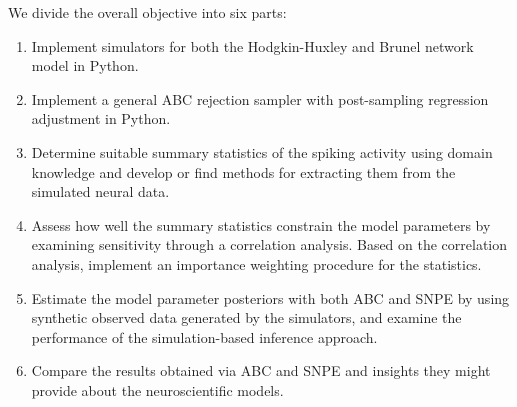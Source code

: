 We divide the overall objective into six parts:
\begin{enumerate}
    \item Implement simulators for both the Hodgkin-Huxley and Brunel network model in Python. 
    \item Implement a general ABC rejection sampler with post-sampling regression adjustment in Python.
    \item Determine suitable summary statistics of the spiking activity using domain knowledge and develop or find methods for extracting them from the simulated neural data. 
    \item Assess how well the summary statistics constrain the model parameters by examining sensitivity through a correlation analysis. Based on the correlation analysis, implement an importance weighting procedure for the statistics. 
    \item Estimate the model parameter posteriors with both ABC and SNPE by using synthetic observed data generated by the simulators, and examine the performance of the simulation-based inference approach. 
    \item Compare the results obtained via ABC and SNPE and insights they might provide about the neuroscientific models. 
\end{enumerate}



